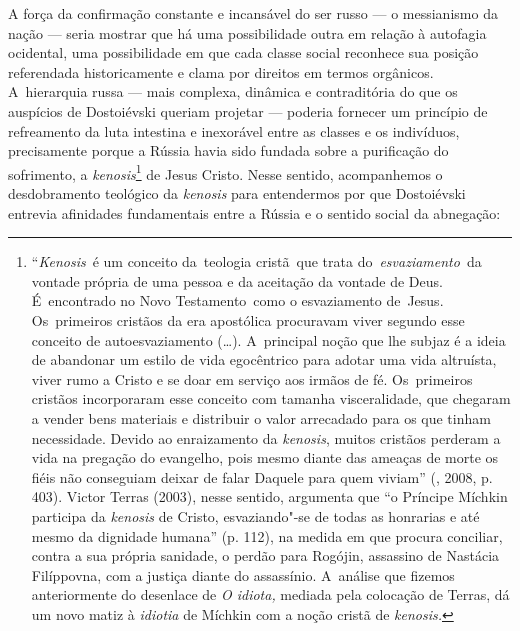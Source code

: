 A força da confirmação constante e incansável do ser russo --- o
messianismo da nação --- seria mostrar que há uma possibilidade outra em
relação à autofagia ocidental, uma possibilidade em que cada classe
social reconhece sua posição referendada historicamente e clama por
direitos em termos orgânicos. A~hierarquia russa --- mais complexa,
dinâmica e contraditória do que os auspícios de Dostoiévski queriam
projetar --- poderia fornecer um princípio de refreamento da luta
intestina e inexorável entre as classes e os indivíduos, precisamente
porque a Rússia havia sido fundada sobre a purificação do sofrimento, a
\emph{kenosis}\footnote{``\emph{Kenosis}~é um conceito da~teologia
  cristã~que trata do~\emph{esvaziamento}~da vontade própria de uma
  pessoa e da aceitação da vontade de Deus. É~encontrado no Novo
  Testamento~como o esvaziamento de~Jesus. Os~primeiros cristãos da era
  apostólica procuravam viver segundo esse conceito de autoesvaziamento
  (\ldots). A~principal noção que lhe subjaz é a ideia de abandonar um
  estilo de vida egocêntrico para adotar uma vida altruísta, viver rumo
  a Cristo e se doar em serviço aos irmãos de fé. Os~primeiros cristãos
  incorporaram esse conceito com tamanha visceralidade, que chegaram a
  vender bens materiais e distribuir o valor arrecadado para os que
  tinham necessidade. Devido ao enraizamento da \emph{kenosis}, muitos
  cristãos perderam a vida na pregação do evangelho, pois mesmo diante
  das ameaças de morte os fiéis não conseguiam deixar de falar Daquele
  para quem viviam'' (, 2008, p. 403). Victor Terras (2003),
  nesse sentido, argumenta que ``o Príncipe Míchkin participa da
  \emph{kenosis} de Cristo, esvaziando"-se de todas as honrarias e até
  mesmo da dignidade humana'' (p. 112), na medida em que procura
  conciliar, contra a sua própria sanidade, o perdão para Rogójin,
  assassino de Nastácia Filíppovna, com a justiça diante do assassínio.
  A~análise que fizemos anteriormente do desenlace de \emph{O idiota,}
  mediada pela colocação de Terras, dá um novo matiz à \emph{idiotia} de
  Míchkin com a noção cristã de \emph{kenosis. }} de Jesus Cristo. Nesse
sentido, acompanhemos o desdobramento teológico da \emph{kenosis} para
entendermos por que Dostoiévski entrevia afinidades fundamentais entre a
Rússia e o sentido social da abnegação:

